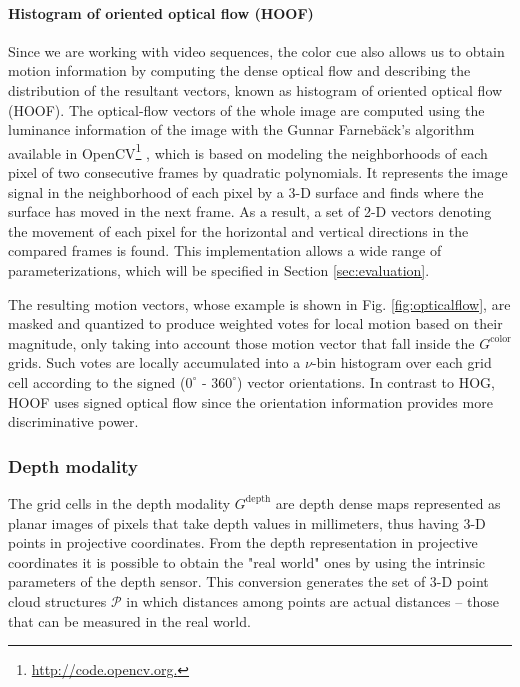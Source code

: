 \documentclass[10pt,twocolumn,letterpaper]{article}
\begin{document}
\paragraph{Histogram of oriented optical flow (HOOF)} 
Since we are working with video sequences, the color cue also allows us to obtain motion information by computing the dense optical flow and describing the distribution of the resultant vectors, known as histogram of oriented optical flow (HOOF)\cite{dalal2006human}. The optical-flow vectors of the whole image are computed using the luminance information of the image with the Gunnar Farneb\"{a}ck's algorithm \cite{farneback2003two} available in OpenCV\footnote{\url{http://code.opencv.org.}} \cite{bradski2008learning}, which is based on modeling the neighborhoods of each pixel of two consecutive frames by quadratic polynomials. It represents the image signal in the neighborhood of each pixel by a 3-D surface and finds where the surface has moved in the next frame. As a result, a set of 2-D vectors denoting the movement of each pixel for the horizontal and vertical directions in the compared frames is found. This implementation allows a wide range of parameterizations, which will be specified in Section \ref{sec:evaluation}.

 The resulting motion vectors, whose example is shown in Fig. \ref{fig:opticalflow}, are masked and quantized to produce weighted votes for local motion based on their magnitude, only taking into account those motion vector that fall inside the $G^\mathrm{color}$ grids. Such votes are locally accumulated into a $\nu$-bin histogram over each grid cell according to the signed ($0^\circ$ - $360^\circ$) vector orientations. In contrast to HOG, HOOF uses signed optical flow since the orientation information provides more discriminative power. 
 

\subsubsection{Depth modality}
\label{sssec:depth}

The grid cells in the depth modality $G^\mathrm{depth}$ are depth dense maps represented as planar images of pixels that take depth values in millimeters, thus having 3-D points in projective coordinates. From the depth representation in projective coordinates it is possible to obtain the "real world" ones by using the intrinsic parameters of the depth sensor. This conversion generates the set of 3-D point cloud structures $\mathcal{P}$ in which distances among points are actual distances -- those that can be measured in the real world. 
\end{document}
